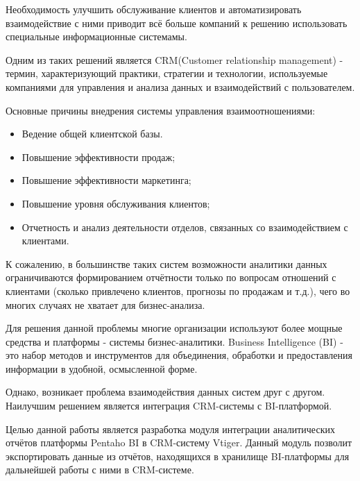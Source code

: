 \intro
Необходимость улучшить обслуживание клиентов и автоматизировать взаимодействие с ними приводит всё больше компаний к решению использовать специальные информационные системамы.

Одним из таких решений является CRM(Customer relationship management) - термин, характеризующий практики, стратегии и технологии, используемые компаниями для управления и анализа данных и взаимодействий с пользователем.\cite{crm}

Основные причины внедрения системы управления взаимоотношениями:

\begin{itemize}
	\item Ведение общей клиентской базы.
	\item Повышение эффективности продаж;
	\item Повышение эффективности маркетинга;
	\item Повышение уровня обслуживания клиентов;
	\item Отчетность и анализ деятельности отделов, связанных со взаимодействием с клиентами.
\end{itemize}

К сожалению, в большинстве таких систем возможности аналитики данных ограничиваются формированием отчётности только по вопросам отношений с клиентами (сколько привлечено клиентов, прогнозы по продажам и т.д.), чего во многих случаях не хватает для бизнес-анализа.

Для решения данной проблемы многие организации используют более мощные средства и платформы - системы бизнес-аналитики. Business Intelligence (BI) - это набор методов и инструментов для объединения, обработки и предоставления информации в удобной, осмысленной форме.

Однако, возникает проблема взаимодействия данных систем друг с другом. Наилучшим решением является интеграция CRM-системы с BI-платформой.

Целью данной работы является разработка модуля интеграции аналитических отчётов платформы Pentaho BI в CRM-систему Vtiger. Данный модуль позволит экспортировать данные из отчётов, находящихся в хранилище BI-платформы для дальнейшей работы с ними в CRM-системе.


